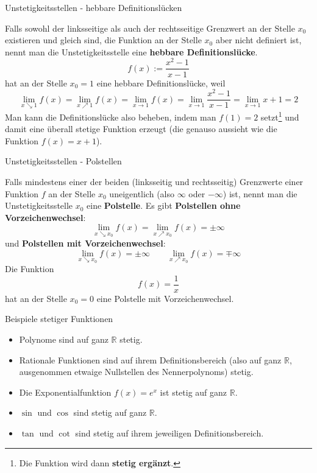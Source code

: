 \begin{frame}{Unstetigkeitsstellen - hebbare Definitionslücken}
	\begin{example}
		Falls sowohl der linksseitige als auch der rechtsseitige Grenzwert an der Stelle $x_{0}$ existieren und gleich sind, die Funktion an der Stelle $x_{0}$ aber nicht definiert ist, nennt man die Unstetigkeitsstelle eine \textbf{hebbare Definitionslücke}.
		\[
		f(x) := \frac{x^2 - 1}{x-1}
		\] 
		hat an der Stelle $x_{0}=1$ eine hebbare Definitionslücke, weil
		\[
			\lim_{x \searrow 1} f(x) = \lim_{x \nearrow 1} f(x) = \lim_{x \to 1} f(x) = \lim_{x \to 1} \frac{x^2 - 1}{x-1} = \lim_{x \to 1} x+1 = 2
		\] 
		Man kann die Definitionslücke also beheben, indem man $f(1)=2$ setzt\footnote{Die Funktion wird dann \textbf{stetig ergänzt}.} und damit eine überall stetige Funktion erzeugt (die genauso aussieht wie die Funktion $f(x)=x+1$).
	\end{example}
\end{frame}

\begin{frame}{Unstetigkeitsstellen - Polstellen}
	\begin{example}
		Falls mindestens einer der beiden (linksseitig und rechtsseitig) Grenzwerte einer Funktion $f$ an der Stelle $x_{0}$ uneigentlich (also $\infty$ oder $-\infty$) ist, nennt man die Unstetigkeitsstelle $x_{0}$ eine \textbf{Polstelle}.
		Es gibt \textbf{Polstellen ohne Vorzeichenwechsel}:
		\[
			\lim_{x \searrow x_{0}} f(x) = \lim_{x \nearrow x_{0}} f(x) = \pm \infty
		\] und \textbf{Polstellen mit Vorzeichenwechsel}:
		\[
		\lim_{x \searrow x_{0}} f(x) = \pm \infty \qquad \lim_{x \nearrow x_{0}} f(x) = \mp \infty
		\]
		Die Funktion
		\[
		f(x)=\frac{1}{x} 
		\]
		hat an der Stelle $x_{0}=0$ eine Polstelle mit Vorzeichenwechsel.
	\end{example}
\end{frame}

\begin{frame}{Beispiele stetiger Funktionen}
	\begin{example}
		\begin{itemize}
			\item Polynome sind auf ganz $\mathbb{R}$ stetig.
			\item Rationale Funktionen sind auf ihrem Definitionsbereich (also auf ganz $\mathbb{R}$, ausgenommen etwaige Nullstellen des Nennerpolynoms) stetig.
			\item Die Exponentialfunktion $f(x)=e^x$ ist stetig auf ganz $\mathbb{R}$.
			\item $\sin$ und $\cos$ sind stetig auf ganz $\mathbb{R}$.
			\item $\tan$ und $\cot$ sind stetig auf ihrem jeweiligen Definitionsbereich.
		\end{itemize}
	\end{example}
\end{frame}

